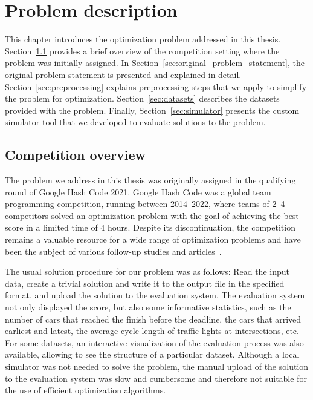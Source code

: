 \chapter{Problem description} \label{chap:problem_description}

This chapter introduces the optimization problem addressed in this thesis. Section~\ref{sec:competition_overview} provides a brief overview of the competition setting where the problem was initially assigned. In Section~\ref{sec:original_problem_statement}, the original problem statement is presented and explained in detail.
Section~\ref{sec:preprocessing} explains preprocessing steps that we apply to simplify the problem for optimization.
Section~\ref{sec:datasets} describes the datasets provided with the problem. Finally, Section~\ref{sec:simulator} presents the custom simulator tool that we developed to evaluate solutions to the problem.

\section{Competition overview} \label{sec:competition_overview}

The problem we address in this thesis was originally assigned in the qualifying round of Google Hash Code 2021. Google Hash Code was a global team programming competition, running between 2014--2022, where teams of 2--4 competitors solved an optimization problem with the goal of achieving the best score in a limited time of 4 hours. Despite its discontinuation, the competition remains a valuable resource for a wide range of optimization problems and have been the subject of various follow-up studies and articles~\cite{rodrigues2023principled, li2022building}.

The usual solution procedure for our problem was as follows: Read the input data, create a trivial solution and write it to the output file in the specified format, and upload the solution to the evaluation system. The evaluation system not only displayed the score, but also some informative statistics, such as the number of cars that reached the finish before the deadline, the cars that arrived earliest and latest, the average cycle length of traffic lights at intersections, etc.
For some datasets, an interactive visualization of the evaluation process was also available, allowing to see the structure of a particular dataset. Although a local simulator was not needed to solve the problem, the manual upload of the solution to the evaluation system was slow and cumbersome and therefore not suitable for the use of efficient optimization algorithms.

